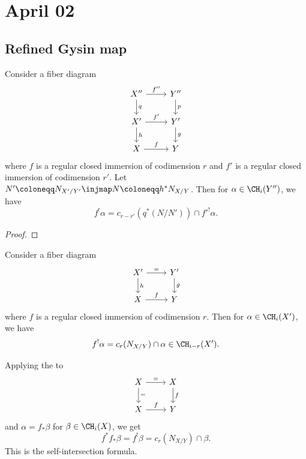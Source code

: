 \section{April 02}


\subsection{Refined Gysin map}

  \begin{theorem}
    Consider a fiber diagram
    \[ \begin{tikzcd}
      X'' \ar[r,"f''"] \ar[d, "q"] & Y'' \ar[d, "p"] \\
      X' \ar[r, "f'"] \ar[d, "h"] & Y' \ar[d, "g"] \\
      X \ar[r, "f"] & Y
    \end{tikzcd} \]
    where $f$ is a regular closed immersion of codimension $r$ and $f'$ is a regular closed immersion of codimension $r'$.
    Let $N' \coloneqq N_{X'/Y'} \injmap N \coloneqq h^* N_{X/Y}$.
    Then for $\alpha \in \CH_i(Y'')$, we have
    \[ f^! \alpha = c_{r-r'}(q^*(N/N')) \cap f'^! \alpha. \]
  \end{theorem}
  \begin{proof}
    \Yang{}
  \end{proof}

  \begin{corollary}
    Consider a fiber diagram
    \[ \begin{tikzcd}
      X' \ar[r, "="] \ar[d, "h"] & Y' \ar[d, "g"] \\
      X \ar[r, "f"] & Y
    \end{tikzcd} \]
    where $f$ is a regular closed immersion of codimension $r$.
    Then for $\alpha \in \CH_i(X')$, we have
    \[ f^! \alpha = c_r(N_{X/Y}) \cap \alpha \in \CH_{i-r}(X'). \]
  \end{corollary}

  Applying the \Yang{} to 
  \[ \begin{tikzcd}
    X \ar[r, "="] \ar[d, "="] & X \ar[d, "f"] \\
    X \ar[r, "f"] & Y
  \end{tikzcd} \]
  and $\alpha = f_* \beta$ for $\beta \in \CH_i(X)$, we get
  \[ f^* f_* \beta = f^! \beta = c_r(N_{X/Y}) \cap \beta. \]
  This is the self-intersection formula.

